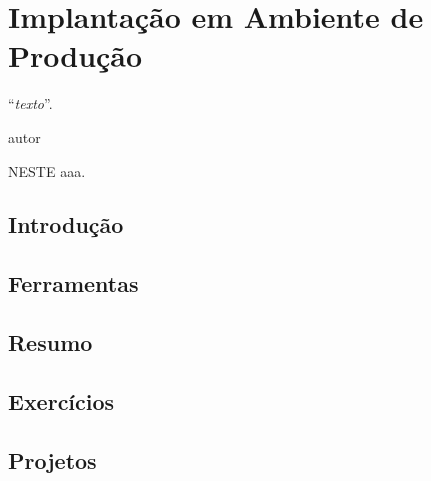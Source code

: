 \chapter{Implantação em Ambiente de Produção}\label{cap:implantacao}
\epigraph{``\textit{texto}''.}{autor}

\lettrine[lines=4, lhang=0.1, lraise=0, loversize=0.2, findent=0.1em]{\textcolor{corAzulTema}{N}}{ESTE} aaa.

\section{Introdução}

\section{Ferramentas}

\section{Resumo}

\section{Exercícios}

\section{Projetos}
